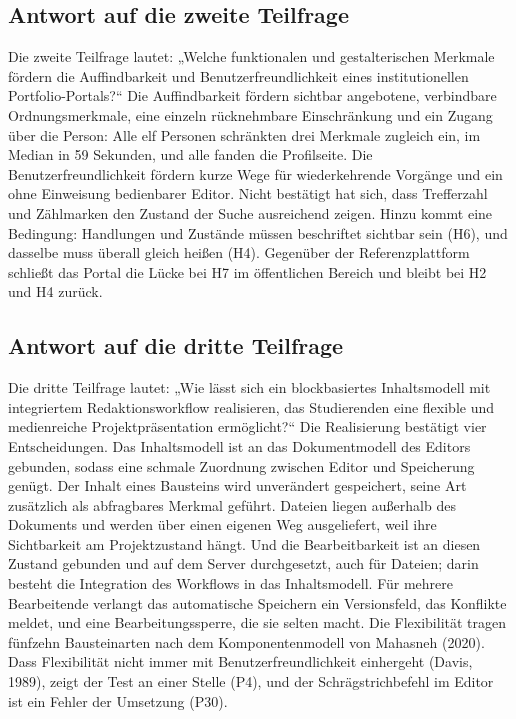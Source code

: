 \subsection{Antwort auf die zweite Teilfrage}
\label{subsec:antwort-tf2-kurz}

Die zweite Teilfrage lautet: „Welche funktionalen und gestalterischen Merkmale fördern die Auffindbarkeit und Benutzerfreundlichkeit eines institutionellen Portfolio-Portals?“ Die Auffindbarkeit fördern sichtbar angebotene, verbindbare Ordnungsmerkmale, eine einzeln rücknehmbare Einschränkung und ein Zugang über die Person: Alle elf Personen schränkten drei Merkmale zugleich ein, im Median in 59 Sekunden, und alle fanden die Profilseite. Die Benutzerfreundlichkeit fördern kurze Wege für wiederkehrende Vorgänge und ein ohne Einweisung bedienbarer Editor. Nicht bestätigt hat sich, dass Trefferzahl und Zählmarken den Zustand der Suche ausreichend zeigen. Hinzu kommt eine Bedingung: Handlungen und Zustände müssen beschriftet sichtbar sein (H6), und dasselbe muss überall gleich heißen (H4). Gegenüber der Referenzplattform schließt das Portal die Lücke bei H7 im öffentlichen Bereich und bleibt bei H2 und H4 zurück.

\subsection{Antwort auf die dritte Teilfrage}
\label{subsec:antwort-tf3}

Die dritte Teilfrage lautet: „Wie lässt sich ein blockbasiertes Inhaltsmodell mit integriertem Redaktionsworkflow realisieren, das Studierenden eine flexible und medienreiche Projektpräsentation ermöglicht?“ Die Realisierung bestätigt vier Entscheidungen. Das Inhaltsmodell ist an das Dokumentmodell des Editors gebunden, sodass eine schmale Zuordnung zwischen Editor und Speicherung genügt. Der Inhalt eines Bausteins wird unverändert gespeichert, seine Art zusätzlich als abfragbares Merkmal geführt. Dateien liegen außerhalb des Dokuments und werden über einen eigenen Weg ausgeliefert, weil ihre Sichtbarkeit am Projektzustand hängt. Und die Bearbeitbarkeit ist an diesen Zustand gebunden und auf dem Server durchgesetzt, auch für Dateien; darin besteht die Integration des Workflows in das Inhaltsmodell. Für mehrere Bearbeitende verlangt das automatische Speichern ein Versionsfeld, das Konflikte meldet, und eine Bearbeitungssperre, die sie selten macht. Die Flexibilität tragen fünfzehn Bausteinarten nach dem Komponentenmodell von Mahasneh (2020). Dass Flexibilität nicht immer mit Benutzerfreundlichkeit einhergeht (Davis, 1989), zeigt der Test an einer Stelle (P4), und der Schrägstrichbefehl im Editor ist ein Fehler der Umsetzung (P30).

